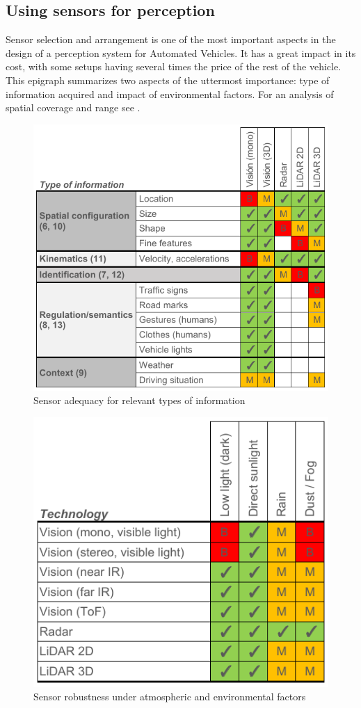 \documentclass[journal]{IEEEtran}
\begin{document}
\subsection{Using sensors for perception}
\label{sec:03-e-sensors-for-perception}

Sensor selection and arrangement is one of the most important aspects in the 
design of a perception system for Automated Vehicles. It has a great impact
in its cost, with some setups having several times the price of the rest of 
the vehicle. 
This epigraph summarizes two aspects of the uttermost importance: type of 
information acquired and impact of environmental factors. For an analysis of
spatial coverage and range see \cite{Schoettle2017}.

\begin{figure}%
	\centering
	\includegraphics[width=0.95\linewidth]{"fig1"} 
	\caption{Sensor adequacy for relevant types of information}
	\label{fig:information_vs_sensors}
\end{figure}
\begin{figure}[b]
	\centering
	\includegraphics[width=0.68\linewidth]{"fig2"} 
	\caption{Sensor robustness under atmospheric and environmental factors}
	\label{fig:sensors-environ}
\end{figure}
\end{document}
